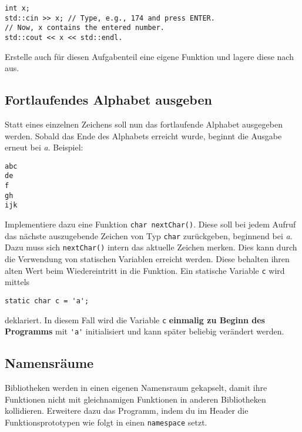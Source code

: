 \begin{lstlisting}
int x;
std::cin >> x; // Type, e.g., 174 and press ENTER.
// Now, x contains the entered number.
std::cout << x << std::endl.
\end{lstlisting}

Erstelle auch für diesen Aufgabenteil eine eigene Funktion und lagere diese nach  aus.

\subsection{Fortlaufendes Alphabet ausgeben}
Statt eines einzelnen Zeichens soll nun das fortlaufende Alphabet ausgegeben werden.
Sobald das Ende des Alphabets erreicht wurde, beginnt die Ausgabe erneut bei \emph{a}.
Beispiel:

\begin{lstlisting}
abc
de
f
gh
ijk
\end{lstlisting}

Implementiere dazu eine Funktion \lstinline{char nextChar()}.
Diese soll bei jedem Aufruf das nächste auszugebende Zeichen von Typ \lstinline{char} zurückgeben, beginnend bei \emph{a}.
Dazu muss sich \lstinline{nextChar()} intern das aktuelle Zeichen merken.
Dies kann durch die Verwendung von statischen Variablen erreicht werden. Diese behalten ihren alten Wert beim Wiedereintritt in die Funktion.
Ein statische Variable \lstinline{c} wird mittels

\begin{lstlisting}
static char c = 'a';
\end{lstlisting}

deklariert.
In diesem Fall wird die Variable \lstinline{c} \textbf{einmalig zu Beginn des Programms} mit \lstinline{'a'} initialisiert und kann später beliebig verändert werden.


\subsection{Namensräume}
Bibliotheken werden in einen eigenen Namensraum gekapselt, damit ihre Funktionen nicht mit gleichnamigen Funktionen in anderen Bibliotheken kollidieren.
Erweitere dazu das Programm, indem du im Header die Funktionsprototypen wie
folgt in einen \lstinline{namespace} setzt.

